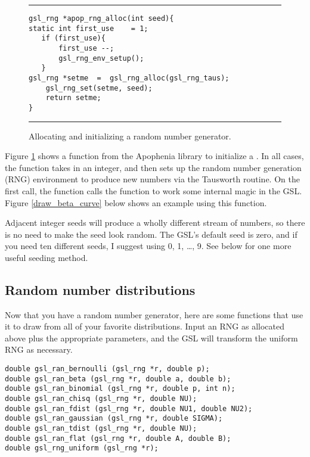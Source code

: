 \begin{figure}
	\hrule\vskip4pt
\begin{lstlisting}[frame=none]
gsl_rng *apop_rng_alloc(int seed){
static int first_use    = 1;
   if (first_use){
       first_use --;
       gsl_rng_env_setup();
   }
gsl_rng *setme  =  gsl_rng_alloc(gsl_rng_taus);
    gsl_rng_set(setme, seed);
    return setme;
}
\end{lstlisting}
	\hrule
\caption{Allocating and initializing a random number generator.}
\label{rng_alloc}
\end{figure}

Figure \ref{rng_alloc} shows a function from the Apophenia library to initialize a .
In all cases, the function takes in an integer, and then sets up the
random number generation (RNG) environment to produce new numbers
via the Tausworth routine.  On the first call, the function calls the
 function to work some internal magic in
the GSL. Figure \ref{draw_beta_curve} below shows an example using this
function.

Adjacent integer seeds will produce a wholly different stream of numbers,
so there is no need to make the seed look random. The GSL's default seed is
zero, and if you need ten different seeds, I suggest using 0, 1, \dots, 9.
See below for one more useful seeding method.

\subsection{Random number distributions}
Now that you have a random number generator, here are some functions that use it to draw from all of your favorite distributions. Input an RNG as allocated above plus the appropriate parameters, and the GSL will transform the uniform RNG as necessary.
    
  
 

\begin{lstlisting}
double gsl_ran_bernoulli (gsl_rng *r, double p);
double gsl_ran_beta (gsl_rng *r, double a, double b);
double gsl_ran_binomial (gsl_rng *r, double p, int n);
double gsl_ran_chisq (gsl_rng *r, double NU);
double gsl_ran_fdist (gsl_rng *r, double NU1, double NU2);
double gsl_ran_gaussian (gsl_rng *r, double SIGMA);
double gsl_ran_tdist (gsl_rng *r, double NU);
double gsl_ran_flat (gsl_rng *r, double A, double B);
double gsl_rng_uniform (gsl_rng *r);
\end{lstlisting}


